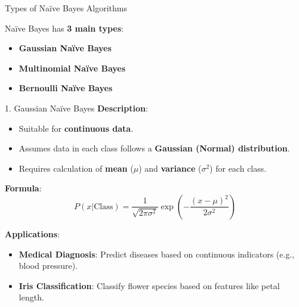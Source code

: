 \begin{frame}	{Types of Naïve Bayes Algorithms}
	
	
	
	Naïve Bayes has \textbf{3 main types}:
	\begin{itemize}
		\item \textbf{Gaussian Naïve Bayes}
		\item \textbf{Multinomial Naïve Bayes}
		\item \textbf{Bernoulli Naïve Bayes}
	\end{itemize}
\end{frame}

\begin{frame}{1. Gaussian Naïve Bayes}
	\textbf{Description}:
	\begin{itemize}
		\item Suitable for \textbf{continuous data}.
		\item Assumes data in each class follows a \textbf{Gaussian (Normal) distribution}.
		\item Requires calculation of \textbf{mean} (\(\mu\)) and \textbf{variance} (\(\sigma^2\)) for each class.
	\end{itemize}
	
	\textbf{Formula}:
	\[
	P(x | \text{Class}) = \frac{1}{\sqrt{2 \pi \sigma^2}} \exp \left( -\frac{(x - \mu)^2}{2 \sigma^2} \right)
	\]
	
	\textbf{Applications}:
	\begin{itemize}
		\item \textbf{Medical Diagnosis}: Predict diseases based on continuous indicators (e.g., blood pressure).
		\item \textbf{Iris Classification}: Classify flower species based on features like petal length.
	\end{itemize}
\end{frame}


